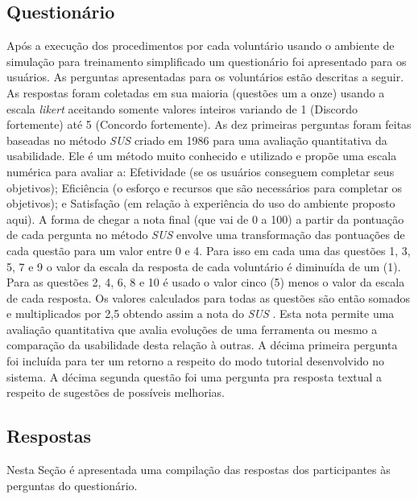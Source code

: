 \subsection{Questionário}
\label{sec:questionarioUsabilidade}

Após a execução dos procedimentos por cada voluntário usando o ambiente de simulação para treinamento simplificado um questionário foi apresentado para os usuários. As perguntas apresentadas para os voluntários estão descritas a seguir. As respostas foram coletadas em sua maioria (questões um a onze) usando a escala \textit{likert} \cite{Norman2010} aceitando somente valores inteiros variando de 1 (Discordo fortemente) até 5 (Concordo fortemente). As dez primeiras perguntas foram feitas baseadas no método \textit{\acrfull{SUS}} \cite{Brooke2013} criado em 1986 para uma avaliação quantitativa da usabilidade. Ele é um método muito conhecido e utilizado e propõe uma escala numérica para avaliar a: Efetividade (se os usuários conseguem completar seus objetivos); 
Eficiência (o esforço e recursos que são necessários para completar os objetivos); e
Satisfação (em relação à experiência do uso do ambiente proposto aqui). A forma de chegar a nota final (que vai de 0 a 100) a partir da pontuação de cada pergunta no método \textit{\acrshort{SUS}} \cite{Brooke2013} envolve uma transformação das pontuações de cada questão para  um valor entre 0 e 4. Para isso em cada uma das questões 1, 3, 5, 7 e 9 o valor da escala da resposta de cada voluntário é diminuída de um (1). Para as questões 2, 4, 6, 8 e 10 é usado o valor cinco (5) menos o valor da escala de cada resposta. Os valores calculados para todas as questões são então somados e multiplicados por 2,5 obtendo assim a nota do \textit{\acrshort{SUS}} \cite{Brooke2013}. Esta nota permite uma avaliação quantitativa que avalia evoluções de uma ferramenta ou mesmo a comparação da usabilidade desta relação à outras. 
A décima primeira pergunta foi incluída para ter um retorno a respeito do modo tutorial desenvolvido no sistema. A décima segunda questão foi uma pergunta pra resposta textual a respeito de sugestões de possíveis melhorias.

\subsection{Respostas}
\label{sec:respostasUsabilidade}

Nesta Seção é apresentada uma compilação das respostas dos participantes às perguntas do questionário.

